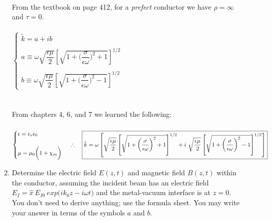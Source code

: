 \documentclass[fleqn]{article}
\begin{document}
\begin{enumerate}
\begin{enumerate}
        \textcolor{hwColor}{
          \\
          From the textbook on page 412, for a \emph{prefect} conductor we have $\rho=\infty$ and $\tau=0$.
          \\
          \\
          $
            \begin{cases}
              \tilde{k}=a+ib
              \\
              \\
              a \equiv \omega \sqrt{\dfrac{\epsilon \mu}{2}} \left[ \sqrt{1+\bigg( \dfrac{\sigma}{\epsilon \omega} \bigg)^2+1} \right]^{1/2}
              \\
              \\
              b \equiv \omega \sqrt{\dfrac{\epsilon \mu}{2}} \left[ \sqrt{1+\bigg( \dfrac{\sigma}{\epsilon \omega} \bigg)^2-1} \right]^{1/2}
            \end{cases}
          $
          \\
          \\
          \\
          From chapters 4, 6, and 7 we learned the following:
          \\
          \\
          $
            \begin{cases}
              \epsilon=\epsilon_r \epsilon_0
              \\
              \\
              \mu=\mu_0 \bigg( 1+ \chi_m \bigg)
            \end{cases}
            \\
            \\
            \\
            \therefore ~~~ \boxed{
              \tilde{k}=\omega \left[
                \sqrt{\dfrac{\epsilon \mu}{2}} \left[ \sqrt{1+\bigg( \dfrac{\sigma}{\epsilon \omega} \bigg)^2+1} \right]^{1/2}
              +i ~ \sqrt{\dfrac{\epsilon \mu}{2}} \left[ \sqrt{1+\bigg( \dfrac{\sigma}{\epsilon \omega} \bigg)^2-1} \right]^{1/2}
              \right]
            }
          $
        }

      \item Determine the electric field $E(z,t)$ and magnetic field $B(z,t)$ within the conductor, assuming
      the incident beam has an electric field $E_I= \hat{x} ~ E_{I0} ~ exp \bigg( i k_0 z - i \omega t \bigg)$ 
      and the metal-vacuum interface is at $z = 0$. You don't need to derive anything; use the formula sheet. 
      You may write your answer in terms of the symbols $a$ and $b$.


\end{enumerate}
\end{enumerate}
\end{document}
